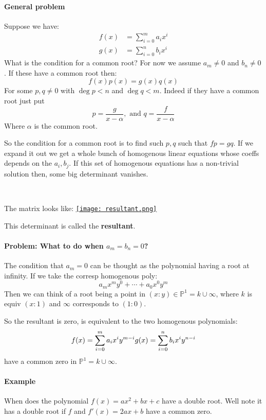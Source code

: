 \paragraph*{General problem}
Suppose we have:\begin{align*}
    f(x) &= \sum_{i=0}^m a_i x^i\\
    g(x) &= \sum_{i=0}^n b_i x^i
\end{align*}
What is the condition for a common root? For now we assume $a_m\neq 0$ and $b_n\neq 0$. If these have a common root then:\[f(x)p(x) = g(x)q(x)\]
For some $p,q\neq 0$ with $\deg p<n$ and $\deg q <m$. Indeed if they have a common root just put \[p = \frac{g}{x-\alpha}, \text{ and }q = \frac{f}{x-\alpha}\] Where $\alpha$ is the common root.

So the condition for a common root is to find such $p,q$ such that $fp = gq$. If we expand it out we get a whole bunch of homogenous linear equations whose coeffs depends on the $a_i,b_j$. If this set of homogenous equations has a non-trivial solution then, some big determinant vanishes.

\

The matrix looks like:
\href{https://youtu.be/nM8aU0IRHGM?t=485}{\texttt{[image: resultant.png]}}

\begin{definition}
    This determinant is called the \textbf{resultant}.    
\end{definition}

\paragraph*{Problem: What to do when $a_m = b_n = 0$?}
The condition that $a_m = 0$ can be thought as the polynomial having a root at infinity. If we take the corresp homogenous poly:\[a_m x^m y^0 + \cdots + a_0 x^0 y^m\]
Then we can think of a root being a point in $(x\colon y) \in \mathbb{P}^1 = k\cup \infty$, where $k$ is equiv $(x\colon 1)$ and $\infty$ corresponds to $(1\colon 0)$.

So the resultant is zero, is equivalent to the two homogenous polynomials:\[    
    f(x) = \sum_{i=0}^m a_i x^i y^{m-i}\\
    g(x) = \sum_{i=0}^n b_i x^i y^{n-i}\]
have a common zero in $\mathbb{P}^1 = k\cup \infty$.


\paragraph*{Example}
When does the polynomial $f(x) = ax^2+bx+c$ have a double root. Well note it has a double root if $f$ and $f'(x) = 2ax+b$ have a common zero.

